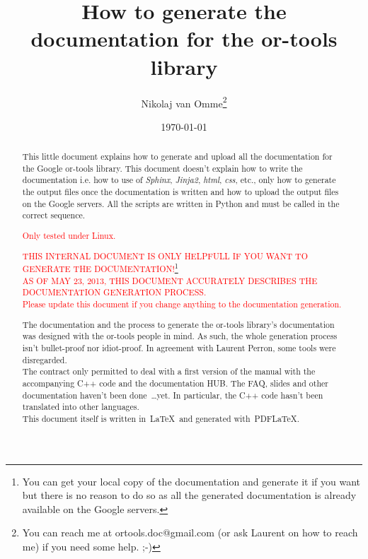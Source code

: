 \documentclass[a4paper,10pt]{article}
\title{How to generate the documentation for the or-tools library}
\author{Nikolaj van Omme\footnote{You can reach me at ortools.doc@gmail.com (or ask Laurent on how to reach me) if you need some help. ;-) }}
\date{\today}
\begin{document}
\maketitle

\begin{abstract}
This little document explains how to generate and upload all the documentation for the Google or-tools library. This document doesn't explain how to write the documentation i.e. how to use of \emph{Sphinx}, \emph{Jinja2}, \emph{html}, \emph{css}, etc., only how to generate the output files once
the documentation is written and how to upload the output files on the Google servers. All the scripts are written in Python and must be called in the correct sequence.\\
\begin{center}\textcolor{red}{Only tested under Linux.}\end{center}
\begin{center}\textcolor{red}{THIS INTERNAL DOCUMENT IS ONLY HELPFULL IF YOU WANT TO GENERATE THE DOCUMENTATION!}\footnote{You can get your local copy of the documentation and generate it if you want but there is no reason to do so as all the generated documentation is already available on the Google servers.}\\
\vspace{0.5cm}
\textcolor{red}{AS OF MAY 23, 2013, THIS DOCUMENT ACCURATELY DESCRIBES THE DOCUMENTATION GENERATION PROCESS.}\\
\vspace{0.2cm}
\textcolor{red}{Please update this document if you change anything to the documentation generation.}
\end{center}

The documentation and the process to generate the or-tools library's documentation was designed with the or-tools people in mind. As such, the whole generation process isn't bullet-proof nor idiot-proof. In agreement with Laurent Perron, some tools were disregarded.\\

The contract only permitted to deal with a first version of the manual with the accompanying C++ code and the documentation HUB. The FAQ, slides and other documentation haven't been done~\ldots yet. In particular, the C++ code hasn't been translated into other languages.\\

This document itself is written in~\LaTeX\ and generated with~PDF\LaTeX.

\end{abstract}
\end{document}
